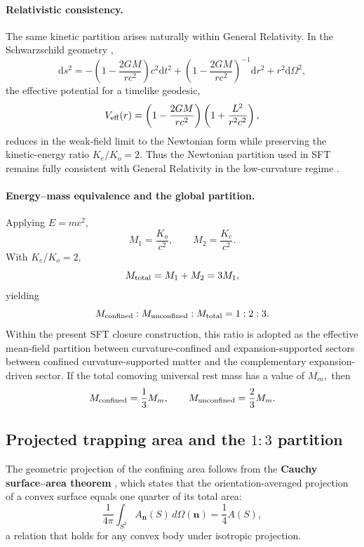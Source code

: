 \documentclass[12pt]{article}
\begin{document}
\paragraph{Relativistic consistency.}
The same kinetic partition arises naturally within General Relativity.
In the Schwarzschild geometry \cite{Schwarzschild1916,Carroll2004},
\begin{equation}
\mathrm{d}s^2 = -\!\left(1-\frac{2GM}{rc^2}\right)c^2\mathrm{d}t^2
+ \!\left(1-\frac{2GM}{rc^2}\right)^{-1}\!\mathrm{d}r^2
+ r^2\mathrm{d}\Omega^2,
\end{equation}
the effective potential for a timelike geodesic,
\[
V_{\rm eff}(r) =
\left(1-\frac{2GM}{rc^2}\right)
\left(1+\frac{L^2}{r^2c^2}\right),
\]
reduces in the weak-field limit to the Newtonian form while preserving
the kinetic-energy ratio \(K_e/K_o = 2.\)
Thus the Newtonian partition used in SFT remains fully consistent
with General Relativity in the low-curvature regime
\cite{Weinberg1972,Carroll2004}.

\paragraph{Energy–mass equivalence and the global partition.}
Applying \(E = mc^2\),
\[
M_1 = \frac{K_o}{c^2}, \qquad M_2 = \frac{K_e}{c^2}.
\]
With \(K_e/K_o = 2,\)
\[
M_{\rm total} = M_1 + M_2 = 3M_1,
\]
yielding
\begin{equation}
M_{\rm confined} : M_{\rm unconfined} : M_{\rm total} = 1 : 2 : 3.
\label{eq:mass_partition_SFT}
\end{equation}
Within the present SFT closure construction, this ratio is adopted as the effective mean-field partition between curvature-confined and expansion-supported sectors between confined curvature-supported
matter and the complementary expansion-driven sector.
If the total comoving universal rest mass has a value of \(M_m,\) then
\[
M_{\rm confined} = \frac{1}{3}M_m, \qquad
M_{\rm unconfined} = \frac{2}{3}M_m.
\]

\subsection{Projected trapping area and the $1{:}3$ partition}
\label{subsec:projected_area}

The geometric projection of the confining area follows from the
\textbf{Cauchy surface–area theorem} \cite{Santalo2004,Schneider1993},
which states that the orientation-averaged projection of a convex surface equals
one quarter of its total area:
\begin{equation}
\frac{1}{4\pi}\!\int_{S^2} A_{\mathbf{n}}(S)\,d\Omega(\mathbf{n})
= \frac{1}{4}A(S),
\label{eq:cauchy}
\end{equation}
a relation that holds for any convex body under isotropic projection.
\end{document}
